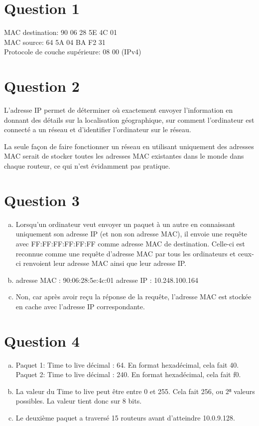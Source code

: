 
\section{Question 1}
MAC destination: 90 06 28 5E 4C 01\\ 
MAC source: 64 5A 04 BA F2 31\\
Protocole de couche supérieure: 08 00 (IPv4)

\section{Question 2}
L'adresse IP permet de déterminer où exactement envoyer l'information  en donnant des détails sur la localisation géographique, sur comment l'ordinateur est connecté a un réseau et d'identifier l'ordinateur sur le réseau.

La seule façon de faire fonctionner un réseau en
utilisant uniquement des adresses MAC serait de
stocker toutes les adresses MAC existantes dans le monde
dans chaque routeur, ce qui n’est évidamment pas pratique.

\section{Question 3}
\begin{enumerate}[(a)]
	\item Lorsqu'un ordinateur veut envoyer un paquet à un autre en connaissant uniquement son adresse IP (et non son adresse MAC), il envoie une requête avec FF:FF:FF:FF:FF:FF comme adresse MAC de destination. Celle-ci est reconnue comme une requête d'adresse MAC par tous les ordinateurs et ceux-ci renvoient leur adresse MAC ainsi que leur adresse IP.
	\item adresse MAC : 90:06:28:5e:4c:01
	adresse IP : 10.248.100.164
	\item Non, car après avoir reçu la réponse de
	la requête, l'adresse MAC est stockée en cache
	 avec l'adresse IP correspondante.
\end{enumerate}

\section{Question 4}
\begin{enumerate}[(a)]
	\item Paquet 1: Time to live décimal : 64. En format hexadécimal, cela fait 40. \\
	Paquet 2: Time to live décimal : 240. En format hexadécimal, cela fait f0.
	\item La valeur du Time to live peut être entre 0 et 255. Cela fait 256, ou 2⁸ valeurs possibles. La valeur tient donc sur 8 bits.

	\item Le deuxième paquet a traversé 15 routeurs avant d'atteindre 10.0.9.128.
\end{enumerate}
